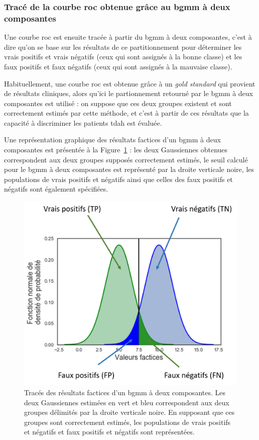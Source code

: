 \subsubsection{Tracé de la courbe \gls{roc} obtenue grâce au \gls{bgmm} à deux composantes}
Une courbe \gls{roc} est ensuite tracée à partir du \gls{bgmm} à deux composantes, c'est à dire qu'on se base sur les résultats de ce partitionnement pour déterminer les 
vrais positifs et vrais négatifs (ceux qui sont assignés à la bonne classe) et les faux positifs et faux négatifs (ceux qui sont assignés à la mauvaise classe). 

Habituellement, une courbe \gls{roc}
est obtenue grâce à un \textit{gold standard} qui provient de résultats cliniques, alors qu'ici le partionnement retourné par le \gls{bgmm} à deux composantes est utilisé : on suppose 
que ces deux groupes existent et sont correctement estimés par cette méthode, et c'est à partir de ces résultats que la capacité à discriminer les patients \gls{tdah} est évaluée.

Une représentation graphique des résultats factices d'un \gls{bgmm} à deux composantes est présentée à la Figure~\ref{Figure:tbr_bgmm_example} : les deux Gaussiennes obtenues correspondent 
aux deux groupes supposés correctement estimés,
le seuil calculé pour le \gls{bgmm} à deux composantes est représenté par la droite verticale noire, les populations de vrais positifs et négatifs ainsi que celles des faux positifs 
et négatifs sont également spécifiées. 

\begin{figure}[h!]
  \centering
	\includegraphics[width=0.7\linewidth]{figures/chapter-4/tbr-bgmm-example} 
  \caption[Tracés des résultats factices d'un \gls{bgmm} à deux composantes.]{Tracés des résultats factices d'un \gls{bgmm} à deux composantes. Les deux Gaussiennes estimées en vert et bleu correspondent aux deux groupes délimités par la droite
	verticale noire. En supposant que ces groupes sont correctement estimés, les populations de vrais positifs et négatifs et faux positifs et négatifs sont représentées.} 
	\label{Figure:tbr_bgmm_example} 
\end{figure}

